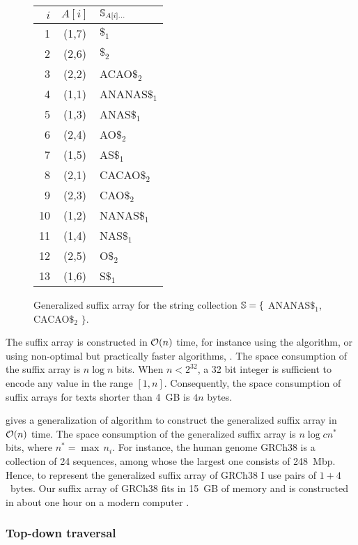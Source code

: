 \begin{figure}[h]
\begin{center}
\caption[Example of generalized suffix array]{Generalized suffix array for the string collection $\mathbb {S} = \{$ {\ttfamily ANANAS$\$_1$}, {\ttfamily CACAO$\$_2$} $\}$.}
\label{fig:gsa}
\ttfamily
\begin{tabular}{rcl}
$i$ & $A[i]$ & $\mathbb {S}_{A[i]\dots}$\\
\midrule
1 & (1,7) & $\$_1$\\
2 & (2,6) & $\$_2$\\
3 & (2,2) & ACAO$\$_2$\\
4 & (1,1) & ANANAS$\$_1$\\
5 & (1,3) & ANAS$\$_1$\\
6 & (2,4) & AO$\$_2$\\
7 & (1,5) & AS$\$_1$\\
8 & (2,1) & CACAO$\$_2$\\
9 & (2,3) & CAO$\$_2$\\
10 & (1,2) & NANAS$\$_1$\\
11 & (1,4) & NAS$\$_1$\\
12 & (2,5) & O$\$_2$\\
13 & (1,6) & S$\$_1$\\
\end{tabular}
\end{center}
\end{figure}

The suffix array is constructed in $\mathcal{O}(n)$ time, for instance using the \citep{Karkkainen2003} algorithm, or using non-optimal but practically faster algorithms, \eg \citep{Schurmann2007}.
The space consumption of the suffix array is $n \log{n}$ bits.
When $n < 2^{32}$, a 32 bit integer is sufficient to encode any value in the range $[1,n]$.
Consequently, the space consumption of suffix arrays for texts shorter than 4~GB is $4 n$ bytes.

\citep{Weese2013} gives a generalization of \citeauthor{Karkkainen2003} algorithm to construct the generalized suffix array in $\mathcal{O}(n)$ time.
The space consumption of the generalized suffix array is $n \log{cn^*}$ bits, where $n^* = \max{\,n_i}$.
For instance, the human genome GRCh38 is a collection of 24 sequences, among whose the largest one consists of 248~Mbp.
Hence, to represent the generalized suffix array of GRCh38 I use pairs of $1+4$~bytes.
Our suffix array of GRCh38 fits in 15~GB of memory and is constructed in about one hour on a modern computer \citep{Weese2013}.

\subsubsection{Top-down traversal}

